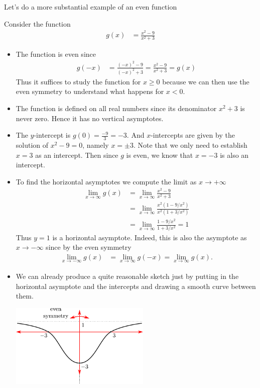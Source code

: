 Let's do a more substantial example of an even function
\begin{eg}
 Consider the function
\begin{align*}
  g(x) &= \frac{x^2-9}{x^2+3}
\end{align*}
\begin{itemize}
 \item The function is even since
\begin{align*}
  g(-x) &= \frac{(-x)^2-9}{(-x)^2+3} = \frac{x^2-9}{x^2+3} = g(x)
\end{align*}
  Thus it suffices to study the function for $x\geq0$ because we can then use the even
symmetry to understand what happens for $x<0$.

\item The function is defined on all real numbers since its denominator $x^2+3$ is never
zero. Hence it has no vertical asymptotes.
\item The $y$-intercept is $g(0) = \frac{-9}{3} = -3$. And $x$-intercepts are given by
the solution of $x^2-9=0$, namely $x=\pm 3$. Note that we only need to establish $x=3$ as
an intercept. Then since $g$ is even, we know that $x=-3$ is also an intercept.
\item To find the horizontal asymptotes we compute the limit as $x\to+\infty$
\begin{align*}
  \lim_{x\to \infty} g(x)
  &= \lim_{x\to \infty} \frac{x^2-9}{x^2+3} \\
  &= \lim_{x\to \infty} \frac{x^2(1-9/x^2)}{x^2(1+3/x^2)} \\
  &= \lim_{x\to \infty} \frac{1-9/x^2}{1+3/x^2} = 1
\end{align*}
Thus $y=1$ is a horizontal asymptote. Indeed, this is also the asymptote as $x\to-\infty$
since by the even symmetry
\begin{align*}
  \lim_{x\to -\infty} g(x)
  &=\lim_{x\to \infty} g(-x)
  = \lim_{x\to \infty} g(x).
\end{align*}
\item We can already produce a quite reasonable sketch just by putting in the horizontal
asymptote and the intercepts and drawing a smooth curve between them.
\begin{efig}
 \begin{center}
  \includegraphics[height=4cm]{extra/sketch6}

\end{center}
\end{efig}
\end{itemize}
\end{eg}
